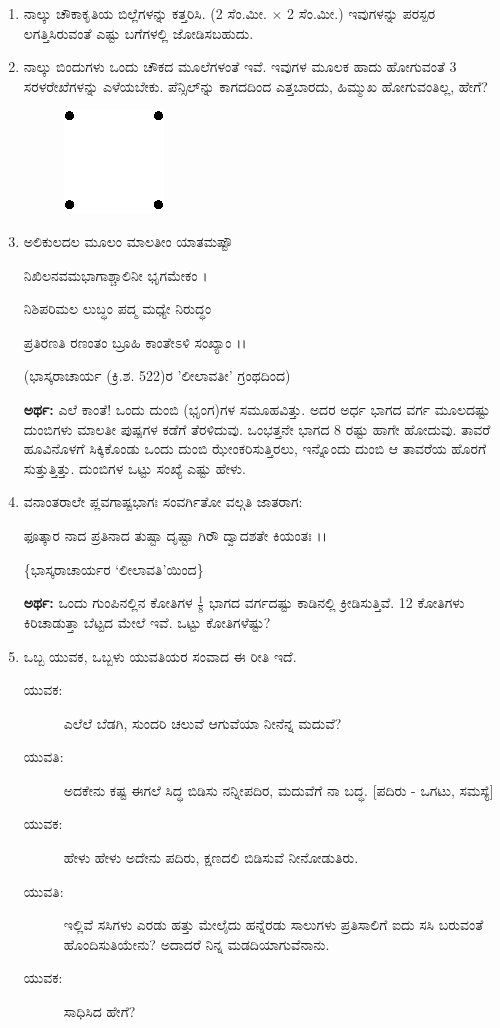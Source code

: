 \begin{enumerate}
\item ನಾಲ್ಕು ಚೌಕಾಕೃತಿಯ ಬಿಲ್ಲೆಗಳನ್ನು ಕತ್ತರಿಸಿ. (2 ಸೆಂ.ಮೀ. $\times$ 2 ಸೆಂ.ಮೀ.) ಇವುಗಳನ್ನು ಪರಸ್ಪರ ಲಗತ್ತಿಸಿರುವಂತೆ ಎಷ್ಟು ಬಗೆಗಳಲ್ಲಿ ಜೋಡಿಸಬಹುದು.

\item ನಾಲ್ಕು ಬಿಂದುಗಳು ಒಂದು ಚೌಕದ ಮೂಲೆಗಳಂತೆ ಇವೆ. ಇವುಗಳ ಮೂಲಕ ಹಾದು ಹೋಗುವಂತೆ 3 ಸರಳರೇಖೆಗಳನ್ನು ಎಳೆಯಬೇಕು. ಪೆನ್ಸಿಲ್‌ನ್ನು  ಕಾಗದದಿಂದ ಎತ್ತಬಾರದು, ಹಿಮ್ಮುಖ ಹೋಗುವಂತಿಲ್ಲ, ಹೇಗೆ? 
\begin{figure}[H]
\centering
\includegraphics{images/chap1/q19.eps}
\end{figure}

\item ಅಲಿಕುಲದಲ ಮೂಲಂ ಮಾಲತೀಂ ಯಾತಮಷ್ಟೌ 

ನಿಖಿಲನವಮಭಾಗಾಶ್ಚಾಲಿನೀ ಭೃಗಮೇಕಂ ।

ನಿಶಿಪರಿಮಲ ಲುಬ್ಧಂ ಪದ್ಮ ಮಧ್ಯೇ ನಿರುದ್ಧಂ

ಪ್ರತಿರಣತಿ ರಣಂತಂ ಬ್ರೂಹಿ ಕಾಂತೇಽಳಿ ಸಂಖ್ಯಾಂ ।।

\hfill (ಭಾಸ್ಕರಾಚಾರ್ಯ (ಕ್ರಿ.ಶ. 522)ರ 'ಲೀಲಾವತೀ' ಗ್ರಂಥದಿಂದ)

\medskip

{\bf ಅರ್ಥ:} ಎಲೆ ಕಾಂತೆ! ಒಂದು ದುಂಬಿ (ಭೃಂಗ)ಗಳ ಸಮೂಹವಿತ್ತು. ಅದರ ಅರ್ಧ ಭಾಗದ ವರ್ಗ ಮೂಲದಷ್ಟು ದುಂಬಿಗಳು ಮಾಲತೀ ಪುಷ್ಪಗಳ ಕಡೆಗೆ ತೆರಳಿದುವು. ಒಂಭತ್ತನೇ ಭಾಗದ 8 ರಷ್ಟು ಹಾಗೇ ಹೋದುವು. ತಾವರೆ ಹೂವಿನೊಳಗೆ ಸಿಕ್ಕಿಕೊಂಡು ಒಂದು ದುಂಬಿ ಝೇಂಕರಿಸುತ್ತಿರಲು, ಇನ್ನೊಂದು ದುಂಬಿ ಆ ತಾವರೆಯ ಹೊರಗೆ ಸುತ್ತುತ್ತಿತ್ತು. ದುಂಬಿಗಳ ಒಟ್ಟು ಸಂಖ್ಯೆ ಎಷ್ಟು ಹೇಳು.

\eject

\item ವನಾಂತರಾಲೇ ಪ್ಲವಗಾಷ್ಟಭಾಗಃ ಸಂವರ್ಗಿತೋ ವಲ್ಗತಿ ಜಾತರಾಗ:

 ಫೂತ್ಕಾರ ನಾದ ಪ್ರತಿನಾದ ತುಷ್ಟಾ  ದೃಷ್ಟಾ ಗಿರೌ ದ್ವಾದಶತೇ ಕಿಯಂತಃ ।।

\hfill \{ಭಾಸ್ಕರಾಚಾರ್ಯರ `ಲೀಲಾವತಿ'ಯಿಂದ\}

{\bf ಅರ್ಥ:} ಒಂದು ಗುಂಪಿನಲ್ಲಿನ ಕೋತಿಗಳ $\frac{1}{8}$ ಭಾಗದ ವರ್ಗದಷ್ಟು ಕಾಡಿನಲ್ಲಿ ಕ್ರೀಡಿಸುತ್ತಿವೆ. 12 ಕೋತಿಗಳು ಕಿರಿಚಾಡುತ್ತಾ ಬೆಟ್ಟದ ಮೇಲೆ ಇವೆ. ಒಟ್ಟು ಕೋತಿಗಳೆಷ್ಟು?

\item ಒಬ್ಬ ಯುವಕ, ಒಬ್ಬಳು ಯುವತಿಯರ ಸಂವಾದ ಈ ರೀತಿ ಇದೆ.
\begin{description}
\item[ಯುವಕ:] ಎಲೆಲೆ ಬೆಡಗಿ, ಸುಂದರಿ ಚಲುವೆ ಆಗುವೆಯಾ ನೀನೆನ್ನ ಮದುವೆ?
\item[ಯುವತಿ:] ಅದಕೇನು ಕಷ್ಟ ಈಗಲೆ ಸಿದ್ಧ ಬಿಡಿಸು ನನ್ನೀಪದಿರ, ಮದುವೆಗೆ ನಾ ಬದ್ಧ.  [ಪದಿರು - ಒಗಟು, ಸಮಸ್ಯೆ]
\item[ಯುವಕ:] ಹೇಳು ಹೇಳು ಅದೇನು ಪದಿರು, ಕ್ಷಣದಲಿ ಬಿಡಿಸುವೆ ನೀನೋಡುತಿರು. 
\item[ಯುವತಿ:] ಇಲ್ಲಿವೆ ಸಸಿಗಳು ಎರಡು ಹತ್ತು ಮೇಲೈದು ಹನ್ನೆರಡು ಸಾಲುಗಳು ಪ್ರತಿಸಾಲಿಗೆ ಐದು ಸಸಿ ಬರುವಂತೆ ಹೊಂದಿಸುತಿಯೇನು? ಅದಾದರೆ ನಿನ್ನ ಮಡದಿಯಾಗುವೆನಾನು.
\item[ಯುವಕ:] ಸಾಧಿಸಿದ ಹೇಗೆ?
\end{description}


\end{enumerate}
